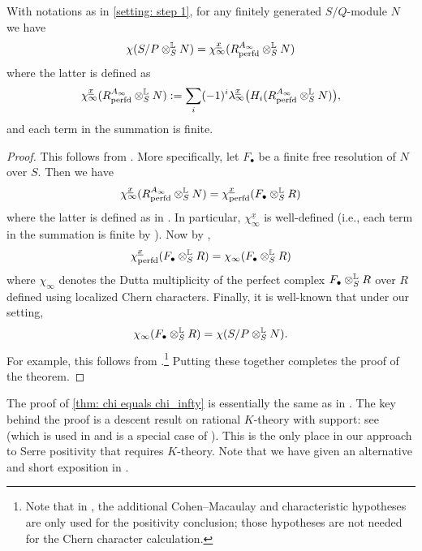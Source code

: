 \documentclass[12pt]{amsart}
\numberwithin{equation}{theorem}
\numberwithin{equation}{theorem}
\newcommand{\perfd}{\textnormal{perfd}}
\begin{document}

\begin{theorem}
\label{thm: chi equals chi_infty}
With notations as in \autoref{setting: step 1}, for any finitely generated $S/Q$-module $N$ we have 
$$\chi(S/P\otimes^\myL_S N) = \chi_\infty^{\underline{x}}(R^{A_\infty}_\perfd \otimes^\myL_SN)$$
where the latter is defined as
$$\chi_\infty^{\underline{x}}(R^{A_\infty}_\perfd \otimes^\myL_SN) := \sum_i (-1)^i \lambda^{\underline{x}}_\infty\big(H_i(R^{A_\infty}_\perfd \otimes^\myL_SN)\big),$$
and each term in the summation is finite.
\end{theorem}
\begin{proof}
This follows from \cite[Section 2]{MaLech2026}. More specifically, let $F_\bullet$ be a finite free resolution of $N$ over $S$. Then we have $$\chi_\infty^{\underline{x}}(R^{A_\infty}_\perfd \otimes^\myL_SN) = \chi_\perfd^{\underline{x}}(F_\bullet \otimes^\myL_S R)$$ where the latter is defined as in \cite[Definition 2.4]{MaLech2026}. In particular, $\chi_\infty^{\underline{x}}$ is well-defined (i.e., each term in the summation is finite by \cite[Lemma 2.3]{MaLech2026}). Now by \cite[Theorem 2.9]{MaLech2026}, $$\chi_\perfd^{\underline{x}}(F_\bullet \otimes^\myL_S R) = \chi_\infty(F_\bullet \otimes^\myL_S R)$$ where $\chi_\infty$ denotes the Dutta multiplicity of the perfect complex $F_\bullet\otimes^{\mathbb{L}}_SR$ over $R$ defined using localized Chern characters. Finally, it is well-known that under our setting,
$$\chi_\infty(F_\bullet \otimes^{\mathbb{L}}_S R) = \chi(S/P\otimes^{\mathbb{L}}_S N).$$
For example, this follows from \cite[calculation on the top of Page 376]{KuranoCharacteristicFreeDutta1993}.\footnote{Note that in \cite[Proposition 3.3]{KuranoCharacteristicFreeDutta1993}, the additional Cohen--Macaulay and characteristic hypotheses are only used for the positivity conclusion; those hypotheses are not needed for the Chern character calculation.} Putting these together completes the proof of the theorem.
\end{proof}

\begin{remark}
The proof of \autoref{thm: chi equals chi_infty} is essentially the same as in \cite{OpenAISerrePositivity2026}. The key behind the proof is a descent result on rational $K$-theory with support: see \cite[Theorem A.1]{MaLech2026} (which is used in \cite[Theorem 2.9]{MaLech2026} and is a special case of \cite[Theorem 3.1]{OpenAISerrePositivity2026}). This is the only place in our approach to Serre positivity that requires $K$-theory. Note that we have given an alternative and short exposition in \cite[Appendix A]{MaLech2026}.
\end{remark}
\end{document}
